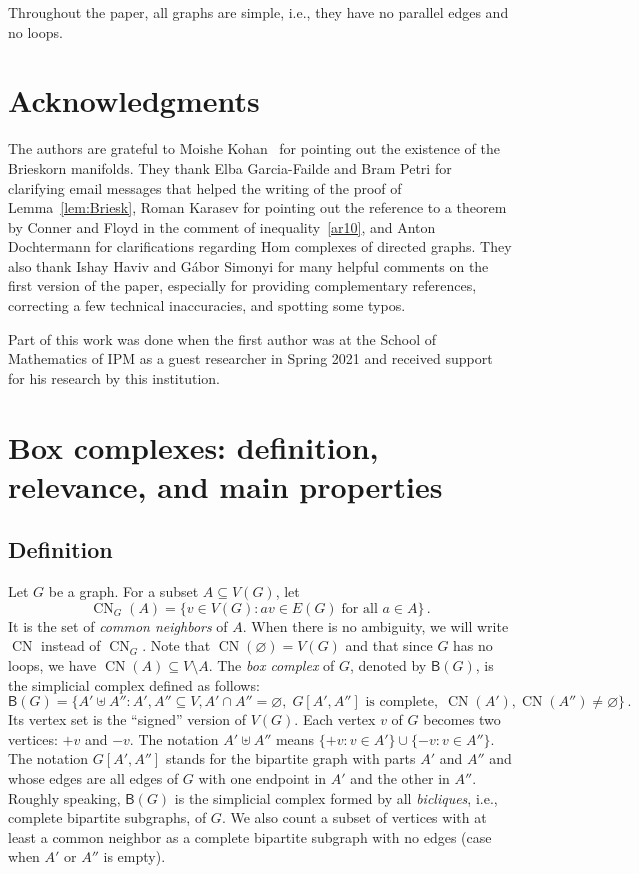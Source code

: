 \documentclass[12pt]{amsart}
\theoremstyle{definition}
\def\B{\mathsf{B}}
\def\CN{\operatorname{CN}}
\newcounter{foo}
\begin{document}
\medskip

Throughout the paper, all graphs are simple, i.e., they have no parallel edges and no loops. %

\section*{Acknowledgments}
The authors are grateful to Moishe Kohan~\cite{moishe} for pointing out the existence of the Brieskorn manifolds. They thank Elba Garcia-Failde and Bram Petri for clarifying email messages that helped the writing of the proof of Lemma~\ref{lem:Briesk}, Roman Karasev for pointing out the reference to a theorem by Conner and Floyd in the comment of inequality~\eqref{ar10}, and Anton Dochtermann for clarifications regarding Hom complexes of directed graphs. They also thank Ishay Haviv and G\'abor Simonyi for many helpful comments on the first version of the paper, especially for providing complementary references, correcting a few technical inaccuracies, and spotting some typos.

 Part of this work was done when the first author was at the School of Mathematics of IPM as a guest researcher in Spring 2021 and received support for his research by this institution.

\setcounter{equation}{\thefoo}
\renewcommand*\theequation{\arabic{equation}}

\section{Box complexes: definition, relevance, and main properties}\label{sec:first}

\subsection{Definition} Let $G$ be a graph. For a subset $A\subseteq V(G)$, let
\[
\CN_G(A) = \{v\in V(G) \colon av\in E(G)\; \text{for all $a\in A$}\} \, .
\]
It is the set of \emph{common neighbors} of $A$. When there is no ambiguity, we will write $\CN$ instead of $\CN_G$. Note that $\CN(\varnothing)=V(G)$ and that since $G$ has no loops, we have $\CN(A)\subseteq V\setminus A$. The \emph{box complex} of $G$, denoted by $\B(G)$, is the simplicial complex defined as follows:
\[
\B(G) = \big\{ A' \uplus A'' \colon A',A'' \subseteq V, A' \cap A'' = \varnothing, \; G[A',A''] \text{ is complete}, \;  \CN(A'),\CN(A'') \neq \varnothing \big\} \, .
\]
Its vertex set is the ``signed'' version of $V(G)$. Each vertex $v$ of $G$ becomes two vertices: $+v$ and $-v$. The notation $A' \uplus A''$ means $\{+v\colon v\in A'\} \cup \{-v\colon v\in A''\}$. The notation $G[A',A'']$ stands for the bipartite graph with parts $A'$ and $A''$ and whose edges are all edges of $G$ with one endpoint in $A'$ and the other in $A''$. Roughly speaking, $\B(G)$ is the simplicial complex formed by all {\em bicliques}, i.e., complete bipartite subgraphs, of $G$. We also count a subset of vertices with at least a common neighbor as a complete bipartite subgraph with no edges (case when $A'$ or $A''$ is empty).
\end{document}
